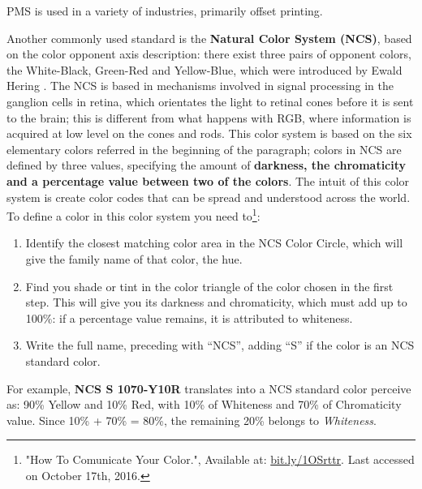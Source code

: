PMS is used in a variety of industries, primarily offset printing. \par
%
Another commonly used standard is the \textbf{Natural Color System (NCS)},  based on the color opponent
axis description: there exist three pairs of opponent colors, the White-Black, Green-Red and Yellow-Blue,
which were introduced by Ewald Hering \cite{Ware2012}. The NCS is based in mechanisms involved in signal processing
in the ganglion cells in retina, which orientates the light to retinal cones before it is sent to the brain;
this is different from what happens with RGB, where information is acquired at low level on the cones and
rods. This color system is based on the six elementary colors referred in the beginning of the paragraph;
colors in NCS are defined by three values, specifying the amount of \textbf{darkness, the chromaticity and a
percentage value between two of the colors}. The intuit of this color system is
create color codes that can be spread and understood across the world. To define a color in this color
system you need to\footnote{\label{ncshowto}"How To Comunicate Your Color.", Available at: \url {bit.ly/1OSrttr}. Last accessed on October 17th, 2016.}:
%
\begin{enumerate}
	\setlength\itemsep{0.01em}
	\item Identify the closest matching color area in the NCS Color Circle, which will give the family name
    of that color, the hue.
	\item Find you shade or tint in the color triangle of the color chosen in the first step. This will give
    you its darkness and chromaticity, which must add up to 100\%: if a percentage value remains, it is
    attributed to whiteness.
	\item Write the full name, preceding with “NCS”, adding “S” if the color is an NCS standard color.
\end{enumerate} \par
%
For example, \textbf{NCS S 1070-Y10R} translates into a NCS standard color perceive as: 90\% Yellow and
10\% Red, with 10\% of Whiteness and 70\% of Chromaticity value. Since 10\% + 70\% = 80\%, the remaining
20\% belongs to \emph{Whiteness}.
%
